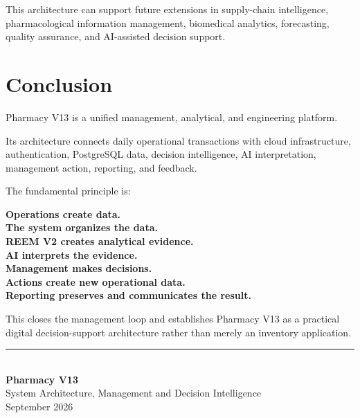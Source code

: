 \documentclass[12pt,a4paper]{article}
\begin{document}
This architecture can support future extensions in supply-chain intelligence, pharmacological information management, biomedical analytics, forecasting, quality assurance, and AI-assisted decision support.

\section*{Conclusion}

Pharmacy V13 is a unified management, analytical, and engineering platform.

Its architecture connects daily operational transactions with cloud infrastructure, authentication, PostgreSQL data, decision intelligence, AI interpretation, management action, reporting, and feedback.

The fundamental principle is:

\begin{keybox}
\textbf{Operations create data.}\\
\textbf{The system organizes the data.}\\
\textbf{REEM V2 creates analytical evidence.}\\
\textbf{AI interprets the evidence.}\\
\textbf{Management makes decisions.}\\
\textbf{Actions create new operational data.}\\
\textbf{Reporting preserves and communicates the result.}
\end{keybox}

This closes the management loop and establishes Pharmacy V13 as a practical digital decision-support architecture rather than merely an inventory application.

\vfill

\begin{center}
\textcolor{maroon}{\rule{0.75\textwidth}{0.6pt}}\\[4pt]
\textbf{Pharmacy V13}\\
System Architecture, Management and Decision Intelligence\\
September 2026
\end{center}
\end{document}
